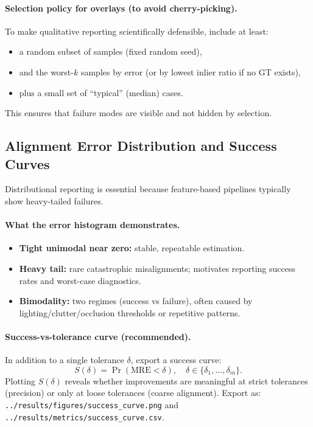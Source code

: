 \paragraph{Selection policy for overlays (to avoid cherry-picking).}
To make qualitative reporting scientifically defensible, include at least:
\begin{itemize}
  \item a random subset of samples (fixed random seed),
  \item and the worst-$k$ samples by error (or by lowest inlier ratio if no GT exists),
  \item plus a small set of ``typical'' (median) cases.
\end{itemize}
This ensures that failure modes are visible and not hidden by selection.

\subsection{Alignment Error Distribution and Success Curves}
Distributional reporting is essential because feature-based pipelines typically show heavy-tailed failures.


\paragraph{What the error histogram demonstrates.}
\begin{itemize}
  \item \textbf{Tight unimodal near zero:} stable, repeatable estimation.
  \item \textbf{Heavy tail:} rare catastrophic misalignments; motivates reporting success rates and worst-case diagnostics.
  \item \textbf{Bimodality:} two regimes (success vs failure), often caused by lighting/clutter/occlusion thresholds or repetitive patterns.
\end{itemize}

\paragraph{Success-vs-tolerance curve (recommended).}
In addition to a single tolerance $\delta$, export a success curve:
\[
S(\delta)=\Pr(\mathrm{MRE}<\delta), \quad \delta\in\{\delta_1,\dots,\delta_m\}.
\]
Plotting $S(\delta)$ reveals whether improvements are meaningful at strict tolerances (precision) or only at loose tolerances (coarse alignment). Export as:
\texttt{../results/figures/success\_curve.png} and \texttt{../results/metrics/success\_curve.csv}.


